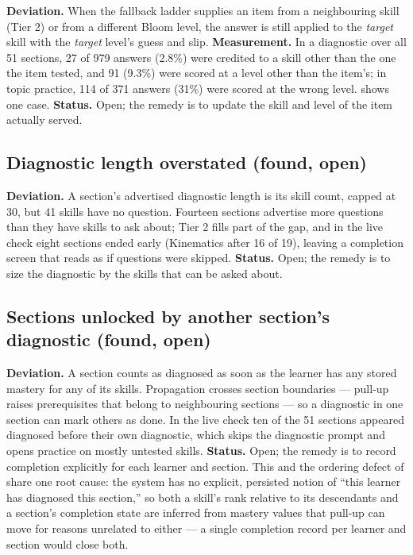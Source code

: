 \textbf{Deviation.} When the fallback ladder supplies an item from a neighbouring
skill (Tier 2) or from a different Bloom level, the answer is still applied to
the \emph{target} skill with the \emph{target} level's guess and slip.
\textbf{Measurement.} In a diagnostic over all 51 sections, 27 of 979 answers
(2.8\%) were credited to a skill other than the one the item tested, and 91
(9.3\%) were scored at a level other than the item's; in topic practice, 114 of
371 answers (31\%) were scored at the wrong level.  shows
one case. \textbf{Status.} Open; the remedy is to update the skill and level of
the item actually served.

\subsection{Diagnostic length overstated (found, open)}
\label{sec:revisions-length}

\textbf{Deviation.} A section's advertised diagnostic length is its skill count,
capped at 30, but 41 skills have no question. Fourteen sections advertise more
questions than they have skills to ask about; Tier 2 fills part of the gap, and
in the live check eight sections ended early (Kinematics after 16 of 19), leaving
a completion screen that reads as if questions were skipped.
\textbf{Status.} Open; the remedy is to size the diagnostic by the skills that
can be asked about.

\subsection{Sections unlocked by another section's diagnostic (found, open)}
\label{sec:revisions-unlock}

\textbf{Deviation.} A section counts as diagnosed as soon as the learner has any
stored mastery for any of its skills. Propagation crosses section boundaries ---
pull-up raises prerequisites that belong to neighbouring sections --- so a
diagnostic in one section can mark others as done. In the live check ten of the
51 sections appeared diagnosed before their own diagnostic, which skips the
diagnostic prompt and opens practice on mostly untested skills.
\textbf{Status.} Open; the remedy is to record completion explicitly for each
learner and section. This and the ordering defect of
 share one root cause: the system has no explicit,
persisted notion of ``this learner has diagnosed this section,'' so both a
skill's rank relative to its descendants and a section's completion state are
inferred from mastery values that pull-up can move for reasons unrelated to
either --- a single completion record per learner and section would close both.

